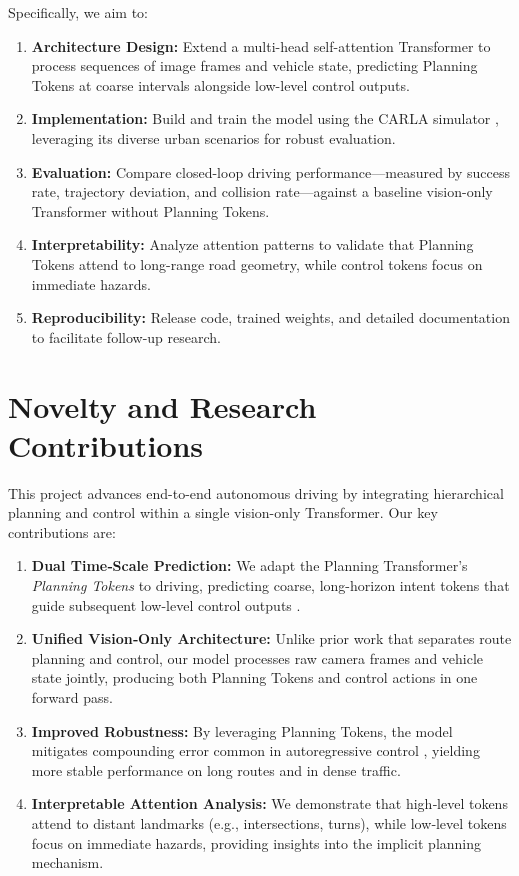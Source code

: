 \documentclass[11pt,a4paper]{article}
\begin{document}
Specifically, we aim to:
\begin{enumerate}
    \item \textbf{Architecture Design:} Extend a multi-head self-attention Transformer to process sequences of image frames and vehicle state, predicting Planning Tokens at coarse intervals alongside low-level control outputs.
    \item \textbf{Implementation:} Build and train the model using the CARLA simulator \cite{Dosovitskiy2017CARLA}, leveraging its diverse urban scenarios for robust evaluation.
    \item \textbf{Evaluation:} Compare closed-loop driving performance—measured by success rate, trajectory deviation, and collision rate—against a baseline vision-only Transformer without Planning Tokens.
    \item \textbf{Interpretability:} Analyze attention patterns to validate that Planning Tokens attend to long-range road geometry, while control tokens focus on immediate hazards.
    \item \textbf{Reproducibility:} Release code, trained weights, and detailed documentation to facilitate follow-up research.
\end{enumerate}


\section*{Novelty and Research Contributions}

This project advances end-to-end autonomous driving by integrating hierarchical planning and control within a single vision-only Transformer. Our key contributions are:

\begin{enumerate}
    \item \textbf{Dual Time‐Scale Prediction:} We adapt the Planning Transformer’s \emph{Planning Tokens} to driving, predicting coarse, long-horizon intent tokens that guide subsequent low-level control outputs \cite{Clinton2024planning}.
    \item \textbf{Unified Vision‐Only Architecture:} Unlike prior work that separates route planning and control, our model processes raw camera frames and vehicle state jointly, producing both Planning Tokens and control actions in one forward pass.
    \item \textbf{Improved Robustness:} By leveraging Planning Tokens, the model mitigates compounding error common in autoregressive control \cite{Chen2021decision}, yielding more stable performance on long routes and in dense traffic.
    \item \textbf{Interpretable Attention Analysis:} We demonstrate that high‐level tokens attend to distant landmarks (e.g., intersections, turns), while low‐level tokens focus on immediate hazards, providing insights into the implicit planning mechanism.
\end{enumerate}
\end{document}
